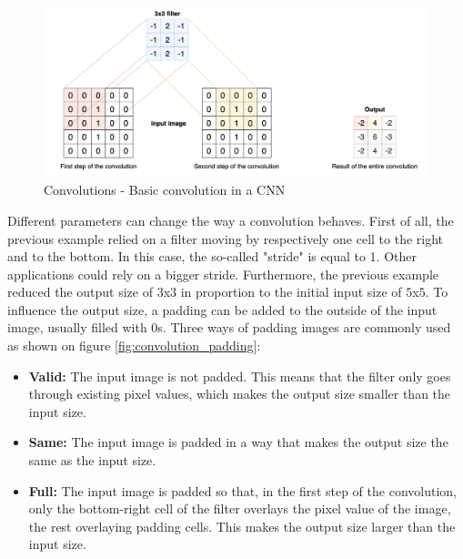 \begin{figure}[!h]
\centering
\includegraphics[width=1\textwidth, keepaspectratio=true]{./figures/convolution.png}
\caption{Convolutions - Basic convolution in a CNN}
\label{fig:convolution}
\end{figure}
\noindent Different parameters can change the way a convolution behaves. First of all, the previous example relied on a filter moving by respectively one cell to the right and to the bottom. In this case, the so-called "stride" is equal to 1. Other applications could rely on a bigger stride. Furthermore, the previous example reduced the output size of $3$x$3$ in proportion to the initial input size of $5$x$5$. To influence the output size, a padding can be added to the outside of the input image, usually filled with 0s. Three ways of padding images are commonly used as shown on figure \ref{fig:convolution_padding}:
\begin{itemize}
	\item \textbf{Valid:} The input image is not padded. This means that the filter only goes through existing pixel values, which makes the output size smaller than the input size. 
	
	\item \textbf{Same:} The input image is padded in a way that makes the output size the same as the input size.
	
	\item \textbf{Full:} The input image is padded so that, in the first step of the convolution, only the bottom-right cell of the filter overlays the pixel value of the image, the rest overlaying padding cells. This makes the output size larger than the input size. 
\end{itemize}

